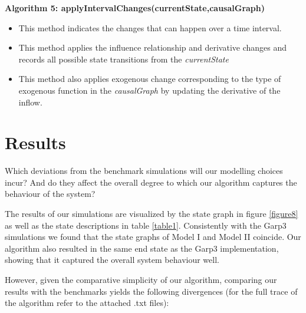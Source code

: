 \documentclass{article}
\begin{document}
\textbf{Algorithm 5: applyIntervalChanges(currentState,causalGraph)}
\begin{itemize}
	\item This method indicates the changes that can happen over a time interval.
	\item This method applies the influence relationship and derivative changes and records all possible state transitions from the \textit{currentState}
	\item This method also applies exogenous change corresponding to the type of exogenous function in the \textit{causalGraph} by updating the derivative of the inflow.  
\end{itemize}

\section{Results}

Which deviations from the benchmark simulations will our modelling choices incur? And do they affect the overall degree to which our algorithm captures the behaviour of the system? 

The results of our simulations are visualized by the state graph in figure \ref{figure8} as well as the state descriptions in table \ref{table1}. Consistently with the Garp3 simulations we found that the state graphs of Model I and Model II coincide. Our algorithm also resulted in the same end state as the Garp3 implementation, showing that it captured the overall system behaviour well.

However, given the comparative simplicity of our algorithm, comparing our results with the benchmarks yields the following divergences (for the full trace of the algorithm refer to the attached .txt files):
\end{document}
